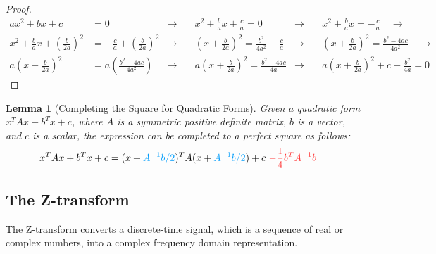 \documentclass[a4 paper]{article}
\numberwithin{equation}{section}
\theoremstyle{boldStyle}
\theoremstyle{boldBlueStyle}
\newtheorem{lemma}{Lemma}[section]
\theoremstyle{boldPurpleStyle}
\theoremstyle{boldRedStyle}
\theoremstyle{boldGreenStyle}
\begin{document}
\begin{proof}
  \begin{align*}
    ax^2 + bx + c &= 0 &\rightarrow\quad & x^2 + \frac{b}{a}x + \frac{c}{a} = 0 &\rightarrow\quad& x^2 + 
    \frac{b}{a}x = -\frac{c}{a} \quad \rightarrow \\
    x^2 + \frac{b}{a}x + \left( \frac{b}{2a} \right)^2 &= -\frac{c}{a} + \left( \frac{b}{2a} \right)^2 
    &\rightarrow\quad& \left( x + \frac{b}{2a} \right)^2 = \frac{b^2}{4a^2} - \frac{c}{a} &\rightarrow\quad& 
    \left( x + \frac{b}{2a} \right)^2 = \frac{b^2 - 4ac}{4a^2} \quad \rightarrow \\
    a\left( x + \frac{b}{2a} \right)^2 &= a\left( \frac{b^2 - 4ac}{4a^2} \right) 
    &\rightarrow\quad& a\left( x + \frac{b}{2a} \right)^2 = \frac{b^2 - 4ac}{4a} 
    &\rightarrow\quad& a\left( x + \frac{b}{2a} \right)^2 + c - \frac{b^2}{4a} = 0
    \end{align*}
\end{proof}

\begin{lemma}[Completing the Square for Quadratic Forms]
  Given a quadratic form \( x^T A x + b^T x + c \), where \( A \) is a symmetric positive definite matrix, \( b \) is a vector, 
  and \( c \) is a scalar, the expression can be completed to a perfect square as follows:
  \begin{align*}
    x^T A x + b^T x + c &= (x + \tblu{A^{-1} b/2})^T A (x + \tblu{A^{-1} b/2}) + c \text{ } \tred{ - \frac{1}{4} b^T A^{-1} b}
  \end{align*}
\end{lemma}









\subsection{The Z-transform}

The Z-transform converts a discrete-time signal, which is a sequence of real or complex numbers, into a complex frequency domain representation. 
\end{document}
